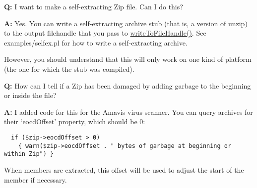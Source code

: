 \documentclass[]{article}
\let\realtextbf=\textbf
\renewcommand{\textbf}[1]{\textcolor{boldcolor}{\realtextbf{#1}}}
\renewcommand{\emph}[1]{\underline{#1}}
\begin{document}

\textbf{Q:} I want to make a self-extracting Zip file. Can I do this?

\textbf{A:} Yes. You can write a self-extracting archive stub (that is,
a version of unzip) to the output filehandle that you pass to
\emph{writeToFileHandle()}. See examples/selfex.pl for how to write a
self-extracting archive.

However, you should understand that this will only work on one kind of
platform (the one for which the stub was compiled).


\textbf{Q:} How can I tell if a Zip has been damaged by adding garbage
to the beginning or inside the file?

\textbf{A:} I added code for this for the Amavis virus scanner. You can
query archives for their `eocdOffset' property, which should be 0:

\begin{verbatim}
  if ($zip->eocdOffset > 0)
    { warn($zip->eocdOffset . " bytes of garbage at beginning or within Zip") }
\end{verbatim}

When members are extracted, this offset will be used to adjust the start
of the member if necessary.

\end{document}
